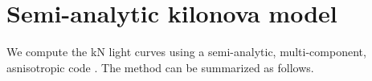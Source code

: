 
















\section{Semi-analytic kilonova model}\label{sec:kilonova:albino}

We compute the \ac{kN} light curves using a 
semi-analytic, multi-component, asnisotropic code \mkn{} 
\citep{Perego:2017wtu,Barbieri:2019sjc,Breschi:2021wzr}. 
%
%
The method can be summarized as follows. 


